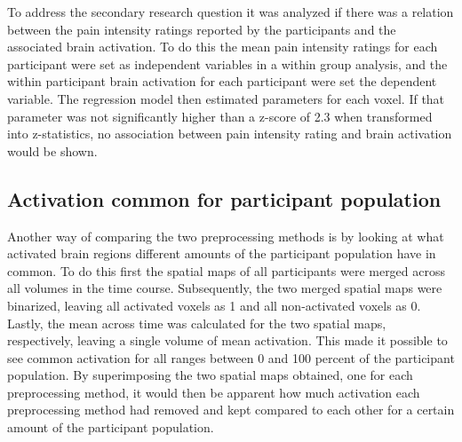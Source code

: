 To address the secondary research question it was analyzed if there was a relation between the pain intensity ratings reported by the participants and the associated brain activation. To do this the mean pain intensity ratings for each participant were set as independent variables in a within group analysis, and the within participant brain activation for each participant were set the dependent variable. The regression model then estimated parameters for each voxel. If that parameter was not significantly higher than a z-score of 2.3 when transformed into z-statistics, no association between pain intensity rating and brain activation would be shown. 

\subsection{Activation common for participant population}
Another way of comparing the two preprocessing methods is by looking at what activated brain regions different amounts of the participant population have in common. To do this first the spatial maps of all participants were merged across all volumes in the time course. Subsequently, the two merged spatial maps were binarized, leaving all activated voxels as 1 and all non-activated voxels as 0. Lastly, the mean across time was calculated for the two spatial maps, respectively, leaving a single volume of mean activation. This made it possible to see common activation for all ranges between 0 and 100 percent of the participant population. By superimposing the two spatial maps obtained, one for each preprocessing method, it would then be apparent how much activation each preprocessing method had removed and kept compared to each other for a certain amount of the participant population.
